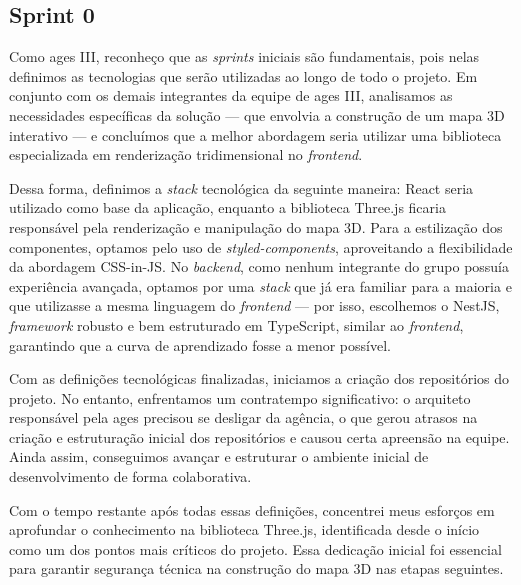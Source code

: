 \subsection{Sprint 0}

Como \ac{ages} III, reconheço que as \textit{sprints} iniciais são fundamentais, pois nelas definimos as tecnologias que serão utilizadas ao longo de todo o projeto. Em conjunto com os demais integrantes da equipe de \ac{ages} III, analisamos as necessidades específicas da solução --- que envolvia a construção de um mapa 3D interativo --- e concluímos que a melhor abordagem seria utilizar uma biblioteca especializada em renderização tridimensional no \textit{frontend}.

Dessa forma, definimos a \textit{stack} tecnológica da seguinte maneira: React seria utilizado como base da aplicação, enquanto a biblioteca Three.js ficaria responsável pela renderização e manipulação do mapa 3D. Para a estilização dos componentes, optamos pelo uso de \textit{styled-components}, aproveitando a flexibilidade da abordagem CSS-in-JS. No \textit{backend}, como nenhum integrante do grupo possuía experiência avançada, optamos por uma \textit{stack} que já era familiar para a maioria e que utilizasse a mesma linguagem do \textit{frontend} --- por isso, escolhemos o NestJS, \textit{framework} robusto e bem estruturado em TypeScript, similar ao \textit{frontend}, garantindo que a curva de aprendizado fosse a menor possível.

Com as definições tecnológicas finalizadas, iniciamos a criação dos repositórios do projeto. No entanto, enfrentamos um contratempo significativo: o arquiteto responsável pela \ac{ages} precisou se desligar da agência, o que gerou atrasos na criação e estruturação inicial dos repositórios e causou certa apreensão na equipe. Ainda assim, conseguimos avançar e estruturar o ambiente inicial de desenvolvimento de forma colaborativa.

Com o tempo restante após todas essas definições, concentrei meus esforços em aprofundar o conhecimento na biblioteca Three.js, identificada desde o início como um dos pontos mais críticos do projeto. Essa dedicação inicial foi essencial para garantir segurança técnica na construção do mapa 3D nas etapas seguintes.
